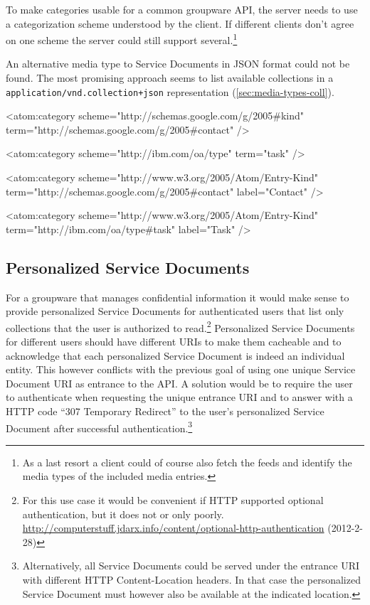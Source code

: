 \documentclass[11pt,a4paper,headsepline,twoside]{scrartcl}		%
\newcommand{\citeurl}[2]{\url{#1} (#2)}
\begin{document}
To make categories usable for a common groupware API, the server needs to use a
categorization scheme understood by the client. If different clients don't agree
on one scheme the server could still support several.\footnote{As a last resort
  a client could of course also fetch the feeds and identify the media types of
  the included media entries.}

An alternative media type to Service Documents in JSON format could not be
found. The most promising approach seems to list available collections in a
\lstinline:application/vnd.collection+json: representation
(\autoref{sec:media-types-coll}).

\begin{anylisting}[label=fig:atom-category,
                   caption={ATOM categories as used by Google and IBM to mark entry
                            types and a proposal to use a standard scheme URI for type terms}]
<atom:category
    scheme="http://schemas.google.com/g/2005#kind"
    term="http://schemas.google.com/g/2005#contact" />

<atom:category 
    scheme="http://ibm.com/oa/type"
    term="task" />

<atom:category 
    scheme="http://www.w3.org/2005/Atom/Entry-Kind"
    term="http://schemas.google.com/g/2005#contact"
    label="Contact" />

<atom:category
     scheme="http://www.w3.org/2005/Atom/Entry-Kind"
     term="http://ibm.com/oa/type#task"
     label="Task" />
\end{anylisting}

\subsection{Personalized Service Documents} For a groupware that manages
confidential information it would make sense to provide personalized Service
Documents for authenticated users that list only collections that the user is
authorized to read.\footnote{For this use case it would be convenient if HTTP
  supported optional authentication, but it does not or only
  poorly. \citeurl{http://computerstuff.jdarx.info/content/optional-http-authentication}{2012-2-28}}
Personalized Service Documents for different users should have different URIs to
make them cacheable and to acknowledge that each personalized Service Document
is indeed an individual entity. This however conflicts with the previous goal of
using one unique Service Document URI as entrance to the API. A solution would
be to require the user to authenticate when requesting the unique entrance URI
and to answer with a HTTP code ``307 Temporary Redirect'' to the user's
personalized Service Document after successful
authentication.\footnote{Alternatively, all Service Documents could be served under
  the entrance URI with different HTTP Content-Location
  headers\cite[sec. 14.14]{RFC2616}. In that case the personalized Service
  Document must however also be available at the indicated location.}
\end{document}
